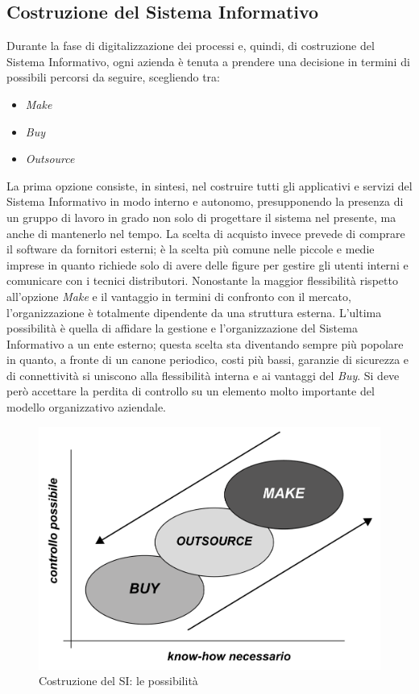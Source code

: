\subsection{Costruzione del Sistema Informativo}
\label{sec:make}
Durante la fase di digitalizzazione dei processi e, quindi, di costruzione del Sistema Informativo, ogni azienda è tenuta a prendere una decisione in termini di possibili percorsi da seguire, scegliendo tra:
\begin{itemize}
    \item \textit{Make}
    \item \textit{Buy}
    \item \textit{Outsource}
\end{itemize}
La prima opzione consiste, in sintesi, nel costruire tutti gli applicativi e servizi del Sistema Informativo in modo interno e autonomo, presupponendo la presenza di un gruppo di lavoro in grado non solo di progettare il sistema nel presente, ma anche di mantenerlo nel tempo. La scelta di acquisto invece prevede di comprare il software da fornitori esterni; è la scelta più comune nelle piccole e medie imprese in quanto richiede solo di avere delle figure per gestire gli utenti interni e comunicare con i tecnici distributori. Nonostante la maggior flessibilità rispetto all'opzione \textit{Make} e il vantaggio in termini di confronto con il mercato, l'organizzazione è totalmente dipendente da una struttura esterna. L'ultima possibilità è quella di affidare la gestione e l'organizzazione del Sistema Informativo a un ente  esterno; questa scelta sta diventando sempre più popolare in quanto, a fronte di un canone periodico, costi più bassi, garanzie di sicurezza e di connettività si uniscono alla flessibilità interna e ai vantaggi del \textit{Buy}. Si deve però accettare la perdita di controllo su un elemento molto importante del modello organizzativo aziendale.
\begin{figure}[!hbt]
\centering
\includegraphics[scale=0.55]{img/makevsbuy.png}
\caption{Costruzione del SI: le possibilità}
\label{fig:makevsbuy}
\end{figure}
